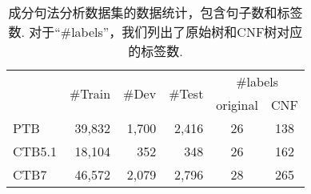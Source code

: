\begin{table}[tb!]
    \centering
    \caption{
        成分句法分析数据集的数据统计，包含句子数和标签数.
        对于``\#labels''，我们列出了原始树和CNF树对应的标签数.
    }
    \begin{tabular}{lrrr|cc}
        \toprule
               & \multirow{2}{*}{\#Train} & \multirow{2}{*}{\#Dev} & \multirow{2}{*}{\#Test} & \multicolumn{2}{c}{\#labels}       \\
               &                          &                        &                         & original                     & CNF \\[1pt]
        \midrule
        PTB    & 39,832                   & 1,700                  & 2,416                   & 26                           & 138 \\
        CTB5.1 & 18,104                   & 352                    & 348                     & 26                           & 162 \\
        CTB7   & 46,572                   & 2,079                  & 2,796                   & 28                           & 265 \\
        \bottomrule
    \end{tabular}
    \label{table:con-statistics}
\end{table}